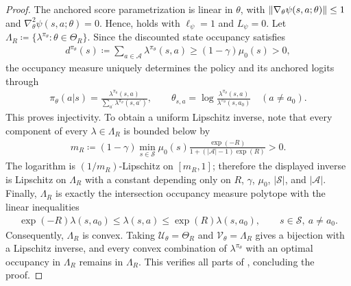 \documentclass{article}
\theoremstyle{plain}
\theoremstyle{definition}
\theoremstyle{remark}
\def\SS{{\mathcal{S}}}
\def\AA{{\mathcal{A}}}
\newcommand{\card}[1]{\left|#1\right|}
\DeclarePairedDelimiter{\norm}{\lVert}{\rVert}
\newcommand{\define}{\coloneqq}
\def\ss{{s}}
\def\aa{{a}}
\def\ss{{s}}
\begin{document}
\begin{proof}
 The anchored score parametrization is linear in $\theta$, with
 $\norm{\nabla_\theta\psi(\ss,\aa;\theta)}\leq 1$ and
 $\nabla^2_\theta\psi(\ss,\aa;\theta)=0$. Hence,
  holds with $\ell_\psi=1$ and $L_\psi=0$.
 Let $\Lambda_R\define
  \{\lambda^{\pi_\theta}:\theta\in\Theta_R\}$. Since the discounted state
 occupancy satisfies
 \begin{align*}
  d^{\pi_\theta}(\ss)
  \define\sum_{\aa\in\AA}\lambda^{\pi_\theta}(\ss,\aa)
  \geq (1-\gamma)\mu_0(\ss)>0,
 \end{align*}
 the occupancy measure uniquely determines the policy and its anchored
 logits through
 \begin{align*}
  \pi_\theta(\aa\vert\ss)
  =\frac{\lambda^{\pi_\theta}(\ss,\aa)}
  {\sum_{\aa^\prime}\lambda^{\pi_\theta}(\ss,\aa^\prime)},
  \qquad
  \theta_{\ss,\aa}
  =\log\frac{\lambda^{\pi_\theta}(\ss,\aa)}
  {\lambda^{\pi_\theta}(\ss,\aa_0)}
  \quad(\aa\neq\aa_0).
 \end{align*}
 This proves injectivity. To obtain a uniform Lipschitz inverse, note
 that every component of every $\lambda\in\Lambda_R$ is bounded below by
 \begin{align*}
  m_R\define
  (1-\gamma)\min_{\ss\in\SS}\mu_0(\ss)
  \frac{\exp(-R)}{1+(\card{\AA}-1)\exp(R)}>0.
 \end{align*}
 The logarithm is $(1/m_R)$-Lipschitz on $[m_R,1]$; therefore the
 displayed inverse is Lipschitz on $\Lambda_R$ with a constant depending only
 on $R$, $\gamma$, $\mu_0$, $\card{\SS}$, and $\card{\AA}$.
 Finally, $\Lambda_R$ is exactly the intersection occupancy
 measure polytope with the linear inequalities
 \begin{align*}
  \exp(-R)\lambda(\ss,\aa_0)
  \leq \lambda(\ss,\aa)
  \leq \exp(R)\lambda(\ss,\aa_0),
  \qquad \ss\in\SS,\ \aa\neq\aa_0.
 \end{align*}
 Consequently, $\Lambda_R$ is convex. Taking
 $\mathcal U_\theta=\Theta_R$ and $\mathcal V_\theta=\Lambda_R$ gives a
 bijection with a Lipschitz inverse, and every convex combination of
 $\lambda^{\pi_\theta}$ with an optimal occupancy in $\Lambda_R$ remains in
 $\Lambda_R$. This verifies all parts of
 , concluding the proof.
\end{proof}
\end{document}
